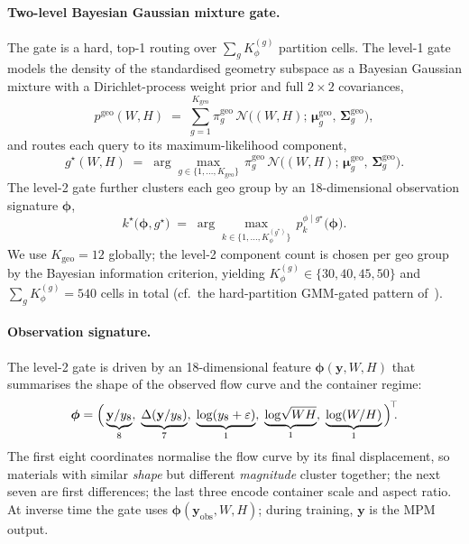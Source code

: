 \paragraph{Two-level Bayesian Gaussian mixture gate.}
The gate is a hard, top-1 routing over
$\sum_{g} K_{\phi}^{(g)}$ partition cells. The level-1 gate models
the density of the standardised geometry subspace as a Bayesian
Gaussian mixture with a Dirichlet-process weight prior and full
$2 \times 2$ covariances,
\begin{equation}
\label{eq:bgm-geo}
    p^{\mathrm{geo}}(W, H)
    \;=\; \sum_{g=1}^{K_{\mathrm{geo}}}
    \pi_{g}^{\mathrm{geo}}\,
    \mathcal{N}\!\bigl((W, H);\,
    \boldsymbol{\mu}_{g}^{\mathrm{geo}},\,
    \boldsymbol{\Sigma}_{g}^{\mathrm{geo}}\bigr),
\end{equation}
and routes each query to its maximum-likelihood component,
\begin{equation}
\label{eq:level1}
    g^{\star}(W, H)
    \;=\;
    \arg\max_{g \in \{1,\dots,K_{\mathrm{geo}}\}}\,
    \pi_{g}^{\mathrm{geo}}\,
    \mathcal{N}\!\bigl((W, H);\,
    \boldsymbol{\mu}_{g}^{\mathrm{geo}},\,
    \boldsymbol{\Sigma}_{g}^{\mathrm{geo}}\bigr).
\end{equation} The level-2 gate further clusters
each geo group by an 18-dimensional observation signature
$\boldsymbol{\phi}$,
\begin{equation}
\label{eq:level2}
    k^{\star}\bigl(\boldsymbol{\phi}, g^{\star}\bigr)
    \;=\;
    \arg\max_{k \in \{1,\dots,K_{\phi}^{(g^{\star})}\}}\,
    p^{\phi\mid g^{\star}}_{k}\bigl(\boldsymbol{\phi}\bigr).
\end{equation}
We use $K_{\mathrm{geo}} = 12$ globally; the level-2 component count
is chosen per geo group by the Bayesian information criterion,
yielding $K_{\phi}^{(g)} \in \{30, 40, 45, 50\}$ and
$\sum_{g} K_{\phi}^{(g)} = 540$ cells in total (cf.~the hard-partition
GMM-gated pattern of~\cite{meeds2006alternative,nguyen2008local}).

\paragraph{Observation signature.}
The level-2 gate is driven by an 18-dimensional feature
$\boldsymbol{\phi}(\mathbf{y}, W, H)$ that summarises the shape of
the observed flow curve and the container regime:
\begin{equation}
\label{eq:phi}
    \boldsymbol{\phi}
    = \Bigl(\,
        \underbrace{\mathbf{y}/y_8}_{8},\;
        \underbrace{\Delta(\mathbf{y}/y_8)}_{7},\;
        \underbrace{\log(y_8 + \varepsilon)}_{1},\;
        \underbrace{\log\!\sqrt{WH}}_{1},\;
        \underbrace{\log(W/H)}_{1}
    \,\Bigr)^{\!\top}\!\!.
\end{equation}
The first eight coordinates normalise the flow curve by its final
displacement, so materials with similar \emph{shape} but different
\emph{magnitude} cluster together; the next seven are first
differences; the last three encode container scale and aspect ratio.
At inverse time the gate uses
$\boldsymbol{\phi}(\mathbf{y}_{\mathrm{obs}}, W, H)$; during training,
$\mathbf{y}$ is the MPM output.

